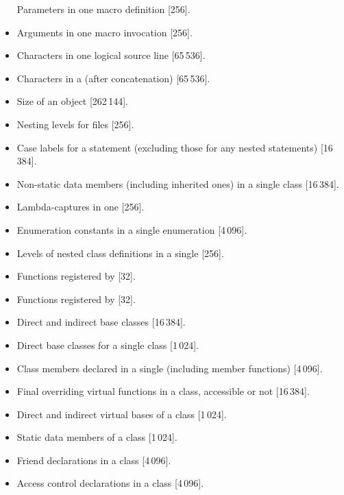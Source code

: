 \begin{itemize}
Parameters in one macro definition [256].
\item%
Arguments in one macro invocation [256].
\item%
Characters in one logical source line [65\,536].
\item%
Characters in a 
(after concatenation) [65\,536].
\item%
Size of an object [262\,144].
\item%
Nesting levels for
files [256].
\item%
Case labels for a
statement (excluding those for any nested
statements)
[16\,384].
\item%
Non-static data members (including inherited ones) in a single class [16\,384].
\item%
Lambda-captures in one  [256].
\item%
Enumeration constants in a single enumeration [4\,096].
\item%
Levels of nested class definitions
in a single
[256].
\item%
Functions registered by
 [32].
\item%
Functions registered by
 [32].
\item%
Direct and indirect base classes [16\,384].
\item%
Direct base classes for a single class [1\,024].
\item%
Class members declared in a single 
(including member functions) [4\,096].
\item%
Final overriding virtual functions in a class,
accessible or not [16\,384].
\item%
Direct and indirect virtual bases of a class [1\,024].
\item%
Static data members of a class [1\,024].
\item%
Friend declarations in a class [4\,096].
\item%
Access control declarations in a class [4\,096].

\end{itemize}
